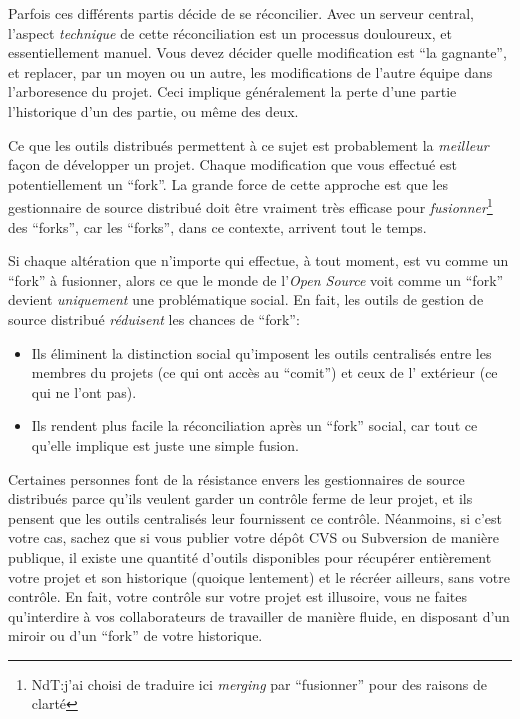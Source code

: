 Parfois ces différents partis décide de se réconcilier. Avec un 
serveur central, l'aspect \emph{technique} de cette réconciliation
est un processus douloureux, et essentiellement manuel. Vous devez
décider quelle modification est ``la gagnante'', et replacer, par un
moyen ou un autre, les modifications de l'autre équipe dans l'arboresence
du projet. Ceci implique généralement la perte d'une partie l'historique 
d'un des partie, ou même des deux.

Ce que les outils distribués permettent à ce sujet est probablement
la \emph{meilleur} façon de développer un projet. Chaque modification
que vous effectué est potentiellement un ``fork''. La grande force de 
cette approche est que les gestionnaire de source distribué doit être
vraiment très efficase pour \emph{fusionner}\footnote{NdT:j'ai choisi de
traduire ici \textit{merging} par ``fusionner'' pour des raisons de clarté}
des ``forks'', car les ``forks'', dans ce contexte, arrivent tout le
temps.

Si chaque altération que n'importe qui effectue, à tout moment, est vu
comme un ``fork'' à fusionner, alors ce que le monde de l'\textit{Open 
Source} voit comme un ``fork'' devient \emph{uniquement} une problématique 
social. En fait, les outils de gestion de source distribué \emph{réduisent} 
les chances de ``fork'':
\begin{itemize}
\item Ils éliminent la distinction social qu'imposent les outils centralisés
	entre les membres du projets (ce qui ont accès au ``comit'') et ceux de l'
	extérieur (ce qui ne l'ont pas).
\item Ils rendent plus facile la réconciliation après un ``fork'' social, car
	tout ce qu'elle implique est juste une simple fusion.
\end{itemize}

Certaines personnes font de la résistance envers les gestionnaires de source
distribués parce qu'ils veulent garder un contrôle ferme de leur projet, et
ils pensent que les outils centralisés leur fournissent ce contrôle. Néanmoins,
si c'est votre cas, sachez que si vous publier votre dépôt CVS ou Subversion
de manière publique, il existe une quantité d'outils disponibles pour récupérer
entièrement votre projet et son historique (quoique lentement) et le récréer 
ailleurs, sans votre contrôle. En fait, votre contrôle sur votre projet est 
illusoire, vous ne faites qu'interdire à vos collaborateurs de travailler
de manière fluide, en disposant d'un miroir ou d'un ``fork'' de votre
historique.

